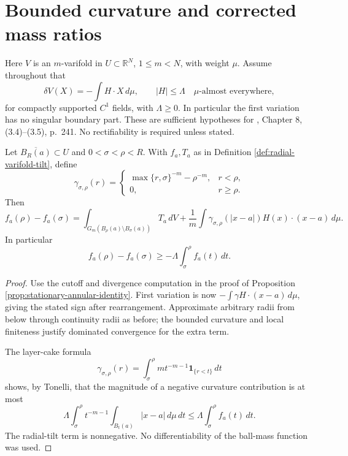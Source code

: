 \chapter{Bounded curvature and corrected mass ratios}\label{sec:varifold-bounded-curvature}
Here $V$ is an $m$-varifold in $U\subset\mathbb R^N$, $1\leq m<N$, with weight $\mu$. Assume throughout that
\[
 \delta V(X)=-\int H\cdot X\,d\mu,\qquad |H|\leq\Lambda\quad\mu\text{-almost everywhere},
\]
for compactly supported $C^1$ fields, with $\Lambda\geq0$. In particular the first variation has no singular boundary part. These are sufficient hypotheses for \cite{Sim18}, Chapter 8, (3.4)--(3.5), p.~241. No rectifiability is required unless stated.

\begin{proposition}\label{prop:curvature-annular-identity}
Let $\overline{B_R(a)}\subset U$ and $0<\sigma<\rho<R$. With $f_a,T_a$ as in Definition \ref{def:radial-varifold-tilt}, define
\[
 \gamma_{\sigma,\rho}(r)=\begin{cases}
 \max\{r,\sigma\}^{-m}-\rho^{-m},&r<\rho,\\0,&r\geq\rho.
 \end{cases}
\]
Then
\[
 f_a(\rho)-f_a(\sigma)
 =\int_{G_m(B_\rho(a)\setminus B_\sigma(a))}T_a\,dV
 +\frac1m\int\gamma_{\sigma,\rho}(|x-a|)H(x)\cdot(x-a)\,d\mu.
\]
In particular
\[
 f_a(\rho)-f_a(\sigma)\geq-\Lambda\int_\sigma^\rho f_a(t)\,dt.
\]
\end{proposition}
\begin{proof}
Use the cutoff and divergence computation in the proof of Proposition \ref{prop:stationary-annular-identity}. First variation is now $-\int\gamma H\cdot(x-a)\,d\mu$, giving the stated sign after rearrangement. Approximate arbitrary radii from below through continuity radii as before; the bounded curvature and local finiteness justify dominated convergence for the extra term.

The layer-cake formula
\[
 \gamma_{\sigma,\rho}(r)=\int_\sigma^\rho m t^{-m-1}\boldsymbol1_{\{r<t\}}\,dt
\]
shows, by Tonelli, that the magnitude of a negative curvature contribution is at most
\[
 \Lambda\int_\sigma^\rho t^{-m-1}
       \int_{B_t(a)}|x-a|\,d\mu\,dt
 \leq\Lambda\int_\sigma^\rho f_a(t)\,dt.
\]
The radial-tilt term is nonnegative. No differentiability of the ball-mass function was used.
\end{proof}

